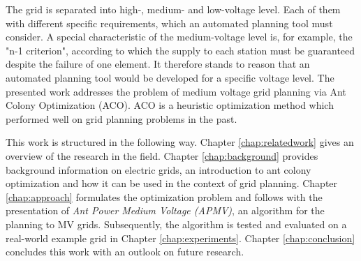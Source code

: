 The grid is separated into high-, medium- and low-voltage level. Each of them with different specific requirements, which an automated planning tool must consider. A special characteristic of the medium-voltage level is, for example, the "n-1 criterion", according to which the supply to each station must be guaranteed despite the failure of one element. It therefore stands to reason that an automated planning tool would be developed for a specific voltage level. The presented work addresses the problem of medium voltage grid planning via Ant Colony Optimization (ACO). ACO is a heuristic optimization method which performed well on grid planning problems in the past.

This work is structured in the following way. Chapter \ref{chap:relatedwork} gives an overview of the research in the field. Chapter \ref{chap:background} provides background information on electric grids, an introduction to ant colony optimization and how it can be used in the context of grid planning. Chapter \ref{chap:approach} formulates the optimization problem and follows with the presentation of \textit{Ant Power Medium Voltage (APMV)}, an algorithm for the planning to MV grids. Subsequently, the algorithm is tested and evaluated on a real-world example grid in Chapter \ref{chap:experiments}. Chapter \ref{chap:conclusion} concludes this work with an outlook on future research.